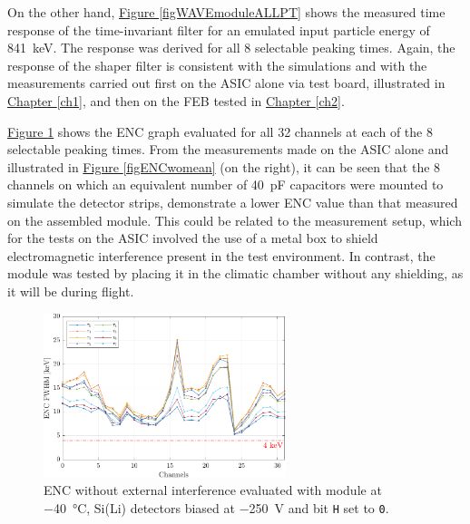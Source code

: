\par
On the other hand, \hyperref[figWAVEmoduleALLPT]{Figure \ref{figWAVEmoduleALLPT}} shows the measured time response of the time-invariant filter for an emulated input particle energy of \SI{841}{\kilo\electronvolt}. The response was derived for all 8 selectable peaking times. Again, the response of the shaper filter is consistent with the simulations and with the measurements carried out first on the ASIC alone via test board, illustrated in \hyperref[ch1]{Chapter \ref{ch1}}, and then on the FEB tested in \hyperref[ch2]{Chapter \ref{ch2}}.

\par
\hyperref[figENCmodule]{Figure \ref{figENCmodule}} shows the ENC graph evaluated for all 32 channels at each of the 8 selectable peaking times. From the measurements made on the ASIC alone and illustrated in \hyperref[figENCwomean]{Figure \ref{figENCwomean}} (on the right), it can be seen that the 8 channels on which an equivalent number of \SI{40}{\pico\farad} capacitors were mounted to simulate the detector strips, demonstrate a lower ENC value than that measured on the assembled module. This could be related to the measurement setup, which for the tests on the ASIC involved the use of a metal box to shield electromagnetic interference present in the test environment. In contrast, the module was tested by placing it in the climatic chamber without any shielding, as it will be during flight.

\begin{figure}[h!]
    \centering
    \includegraphics[width=0.63\textwidth]{Images/chap3/results/ENC_MODULE_40C_250V.pdf}
    \caption{ENC without external interference evaluated with module at \SI{-40}{\celsius}, Si(Li) detectors biased at \SI{-250}{\volt} and bit \texttt{H} set to \texttt{0}.}
    \label{figENCmodule}
\end{figure}

